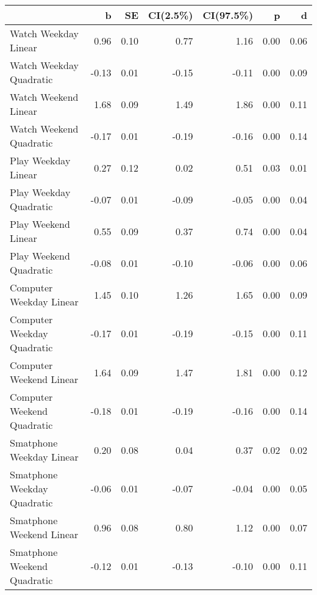 \documentclass[man]{apa6}
\theoremstyle{definition}
\theoremstyle{definition}
\theoremstyle{definition}
\theoremstyle{remark}
\begin{document}
\begin{tabular}{l|r|r|r|r|r|r}
\hline
  & b & SE & CI(2.5\%) & CI(97.5\%) & p & d\\
\hline
Watch Weekday Linear & 0.96 & 0.10 & 0.77 & 1.16 & 0.00 & 0.06\\
\hline
Watch Weekday Quadratic & -0.13 & 0.01 & -0.15 & -0.11 & 0.00 & 0.09\\
\hline
Watch Weekend Linear & 1.68 & 0.09 & 1.49 & 1.86 & 0.00 & 0.11\\
\hline
Watch Weekend Quadratic & -0.17 & 0.01 & -0.19 & -0.16 & 0.00 & 0.14\\
\hline
Play Weekday Linear & 0.27 & 0.12 & 0.02 & 0.51 & 0.03 & 0.01\\
\hline
Play Weekday Quadratic & -0.07 & 0.01 & -0.09 & -0.05 & 0.00 & 0.04\\
\hline
Play Weekend Linear & 0.55 & 0.09 & 0.37 & 0.74 & 0.00 & 0.04\\
\hline
Play Weekend Quadratic & -0.08 & 0.01 & -0.10 & -0.06 & 0.00 & 0.06\\
\hline
Computer Weekday Linear & 1.45 & 0.10 & 1.26 & 1.65 & 0.00 & 0.09\\
\hline
Computer Weekday Quadratic & -0.17 & 0.01 & -0.19 & -0.15 & 0.00 & 0.11\\
\hline
Computer Weekend Linear & 1.64 & 0.09 & 1.47 & 1.81 & 0.00 & 0.12\\
\hline
Computer Weekend Quadratic & -0.18 & 0.01 & -0.19 & -0.16 & 0.00 & 0.14\\
\hline
Smatphone Weekday Linear & 0.20 & 0.08 & 0.04 & 0.37 & 0.02 & 0.02\\
\hline
Smatphone Weekday Quadratic & -0.06 & 0.01 & -0.07 & -0.04 & 0.00 & 0.05\\
\hline
Smatphone Weekend Linear & 0.96 & 0.08 & 0.80 & 1.12 & 0.00 & 0.07\\
\hline
Smatphone Weekend Quadratic & -0.12 & 0.01 & -0.13 & -0.10 & 0.00 & 0.11\\
\hline
\end{tabular}
\end{document}

